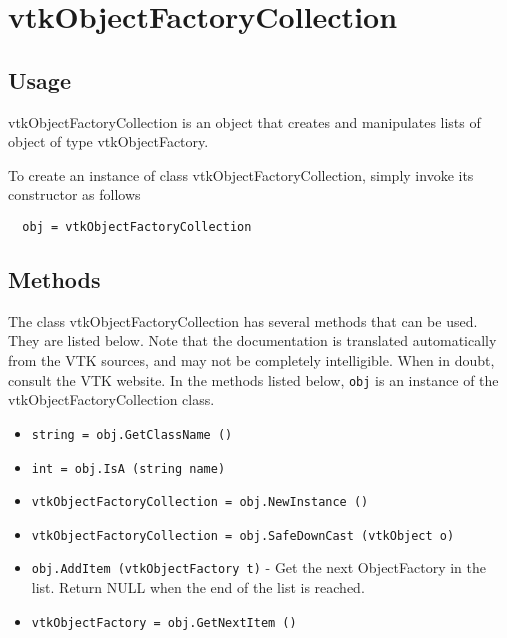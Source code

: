 \section{vtkObjectFactoryCollection}

\subsection{Usage}

 vtkObjectFactoryCollection is an object that creates and manipulates lists
 of object of type vtkObjectFactory.

To create an instance of class vtkObjectFactoryCollection, simply
invoke its constructor as follows
\begin{verbatim}
  obj = vtkObjectFactoryCollection
\end{verbatim}
\subsection{Methods}

The class vtkObjectFactoryCollection has several methods that can be used.
  They are listed below.
Note that the documentation is translated automatically from the VTK sources,
and may not be completely intelligible.  When in doubt, consult the VTK website.
In the methods listed below, \verb|obj| is an instance of the vtkObjectFactoryCollection class.
\begin{itemize}
\item  \verb|string = obj.GetClassName ()|

\item  \verb|int = obj.IsA (string name)|

\item  \verb|vtkObjectFactoryCollection = obj.NewInstance ()|

\item  \verb|vtkObjectFactoryCollection = obj.SafeDownCast (vtkObject o)|

\item  \verb|obj.AddItem (vtkObjectFactory t)| -  Get the next ObjectFactory in the list. Return NULL when the end of the
 list is reached.

\item  \verb|vtkObjectFactory = obj.GetNextItem ()|

\end{itemize}
